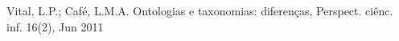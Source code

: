 \documentclass[
12pt,		%
openright,	%
twoside,  %
a4paper,			%
chapter=TITLE,		%
english,			%
french,				%
spanish,			%
brazil				%
]{USPSC-classe/USPSC}
\begin{document}
\begin{flushleft}
\begin{flushleft}
\begin{flushleft}
\begin{flushleft}
\begin{flushleft}
\begin{flushleft}
\begin{flushleft}
\begin{flushleft}
\begin{flushleft}
\begin{flushleft}
 Vital, L.P.; Caf\'e, L.M.A. Ontologias e taxonomias: diferen\c{c}as, Perspect. ci\^enc. inf. 16(2), Jun 2011
\end{flushleft}


\end{flushleft}


\end{flushleft}


\end{flushleft}


\end{flushleft}


\end{flushleft}


\end{flushleft}


\end{flushleft}


\end{flushleft}


\end{flushleft}
\end{document}
